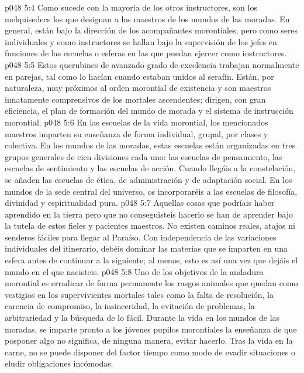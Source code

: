 \vs p048 5:4 \pc Como sucede con la mayoría de los otros instructores, son los melquisedecs los que designan a los maestros de los mundos de las moradas. En general, están bajo la dirección de los acompañantes morontiales, pero como seres individuales y como instructores se hallan bajo la supervisión de los jefes en funciones de las escuelas o esferas en las que puedan ejercer como instructores.
\vs p048 5:5 Estos querubines de avanzado grado de excelencia trabajan normalmente en parejas, tal como lo hacían cuando estaban unidos al serafín. Están, por naturaleza, muy próximos al orden morontial de existencia y son maestros innatamente comprensivos de los mortales ascendentes; dirigen, con gran eficiencia, el plan de formación del mundo de morada y el sistema de instrucción morontial.
\vs p048 5:6 En las escuelas de la vida morontial, los mencionados maestros imparten su enseñanza de forma individual, grupal, por clases y colectiva. En los mundos de las moradas, estas escuelas están organizadas en tres grupos generales de cien divisiones cada uno: las escuelas de pensamiento, las escuelas de sentimiento y las escuelas de acción. Cuando llegáis a la constelación, se añaden las escuelas de ética, de administración y de adaptación social. En los mundos de la sede central del universo, os incorporaréis a las escuelas de filosofía, divinidad y espiritualidad pura.
\vs p048 5:7 \pc Aquellas cosas que podríais haber aprendido en la tierra pero que no conseguisteis hacerlo se han de aprender bajo la tutela de estos fieles y pacientes maestros. No existen caminos reales, atajos ni senderos fáciles para llegar al Paraíso. Con independencia de las variaciones individuales del itinerario, debéis dominar las materias que se imparten en una esfera antes de continuar a la siguiente; al menos, esto es así una vez que dejáis el mundo en el que nacisteis.
\vs p048 5:8 Uno de los objetivos de la andadura morontial es erradicar de forma permanente los rasgos animales que quedan como vestigios en los supervivientes mortales tales como la falta de resolución, la carencia de compromiso, la insinceridad, la evitación de problemas, la arbitrariedad y la búsqueda de lo fácil. Durante la vida en los mundos de las moradas, se imparte pronto a los jóvenes pupilos morontiales la enseñanza de que posponer algo no significa, de ninguna manera, evitar hacerlo. Tras la vida en la carne, no se puede disponer del factor tiempo como modo de evadir situaciones o eludir obligaciones incómodas.
